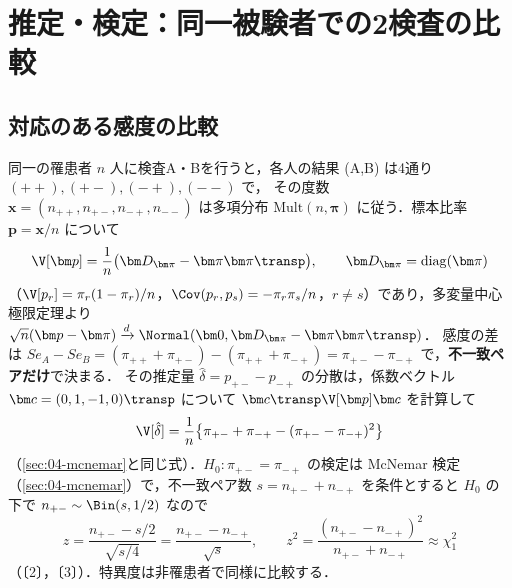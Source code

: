 \section{推定・検定：同一被験者での2検査の比較}\label{sec:05-compare}
\subsection{対応のある感度の比較}\label{subsec:05-sens}
\Hinshutsu 同一の罹患者 $n$ 人に検査A・Bを行うと，各人の結果 (A,B) は4通り $(++),(+-),(-+),(--)$ で，
その度数 $\bm x=(n_{++},n_{+-},n_{-+},n_{--})$ は多項分布 $\mathrm{Mult}(n,\bm\pi)$ に従う．標本比率 $\bm p=\bm x/n$ について
\begin{equation}
\V[\bm p]=\frac1n\bigl(\bm D_{\bm\pi}-\bm\pi\bm\pi\transp\bigr),\qquad \bm D_{\bm\pi}=\mathrm{diag}(\bm\pi)\label{eq:05-multcov}
\end{equation}
（$\V[p_r]=\pi_r(1-\pi_r)/n$，$\Cov(p_r,p_s)=-\pi_r\pi_s/n$，$r\ne s$）であり，多変量中心極限定理より $\sqrt n(\bm p-\bm\pi)\xrightarrow{d}\Normal(\bm0,\bm D_{\bm\pi}-\bm\pi\bm\pi\transp)$．
感度の差は $Se_A-Se_B=(\pi_{++}+\pi_{+-})-(\pi_{++}+\pi_{-+})=\pi_{+-}-\pi_{-+}$ で，\textbf{不一致ペアだけ}で決まる．
その推定量 $\hat\delta=p_{+-}-p_{-+}$ の分散は，係数ベクトル $\bm c=(0,1,-1,0)\transp$ について $\bm c\transp\V[\bm p]\bm c$ を計算して
\begin{equation}
\V[\hat\delta]=\frac1n\bigl\{\pi_{+-}+\pi_{-+}-(\pi_{+-}-\pi_{-+})^2\bigr\}\label{eq:05-sensvar}
\end{equation}
（\cref{sec:04-mcnemar}と同じ式）．$H_0:\pi_{+-}=\pi_{-+}$ の検定は McNemar 検定（\cref{sec:04-mcnemar}）で，不一致ペア数 $s=n_{+-}+n_{-+}$ を条件とすると
$H_0$ の下で $n_{+-}\sim\Bin(s,1/2)$ なので
\[
z=\frac{n_{+-}-s/2}{\sqrt{s/4}}=\frac{n_{+-}-n_{-+}}{\sqrt{s}},\qquad z^2=\frac{(n_{+-}-n_{-+})^2}{n_{+-}+n_{-+}}\approx\chi^2_1
\]
（〔2〕，〔3〕）．特異度は非罹患者で同様に比較する．

